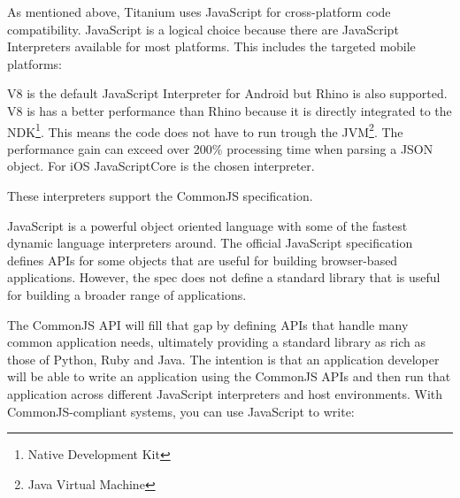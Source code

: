 

As mentioned above, Titanium uses JavaScript for cross-platform code compatibility. JavaScript is a logical choice because there are JavaScript Interpreters available for most platforms. This includes the targeted mobile platforms:

V8 is the default JavaScript Interpreter for Android but Rhino is also supported. V8 is has a better performance than Rhino because it is directly integrated to the NDK\footnote{Native Development Kit}. This means the code does not have to run trough the JVM\footnote{Java Virtual Machine}. The performance gain can exceed over 200\% processing time when parsing a JSON object.\cite{Lukasavage2011}
For iOS JavaScriptCore is the chosen interpreter.

These interpreters support the CommonJS specification.


JavaScript is a powerful object oriented language with some of the fastest dynamic language interpreters around. The official JavaScript specification defines APIs for some objects that are useful for building browser-based applications. However, the spec does not define a standard library that is useful for building a broader range of applications.

The CommonJS API will fill that gap by defining APIs that handle many common application needs, ultimately providing a standard library as rich as those of Python, Ruby and Java. The intention is that an application developer will be able to write an application using the CommonJS APIs and then run that application across different JavaScript interpreters and host environments. With CommonJS-compliant systems, you can use JavaScript to write:


